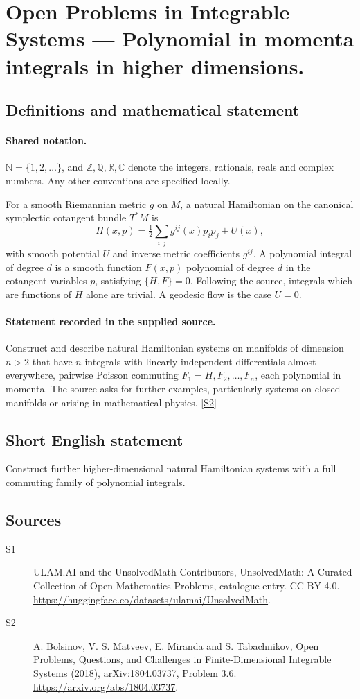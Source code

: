 \documentclass[11pt]{article}
\newcommand{\sref}[2]{\hyperlink{source:#1:#2}{[S#2]}}
\begin{document}
\section{Open Problems in Integrable Systems — Polynomial in momenta integrals in higher dimensions.}\label{statement}

\subsection{Definitions and mathematical statement}

\paragraph{Shared notation.}$\mathbb N=\{1,2,\ldots\}$, and $\mathbb Z,\mathbb Q,\mathbb R,\mathbb C$ denote the integers, rationals, reals and complex numbers. Any other conventions are specified locally.


For a smooth Riemannian metric $g$ on $M$, a natural Hamiltonian on the canonical symplectic cotangent bundle $T^*M$ is \[H(x,p)=\tfrac12\sum_{i,j}g^{ij}(x)p_ip_j+U(x),\] with smooth potential $U$ and inverse metric coefficients $g^{ij}$. A polynomial integral of degree $d$ is a smooth function $F(x,p)$ polynomial of degree $d$ in the cotangent variables $p$, satisfying $\{H,F\}=0$. Following the source, integrals which are functions of $H$ alone are trivial. A geodesic flow is the case $U=0$.
\paragraph{Statement recorded in the supplied source.}
Construct and describe natural Hamiltonian systems on manifolds of dimension $n>2$ that have $n$ integrals with linearly independent differentials almost everywhere, pairwise Poisson commuting $F_1=H,F_2,\ldots,F_n$, each polynomial in momenta. The source asks for further examples, particularly systems on closed manifolds or arising in mathematical physics. \sref{statement}{2}
\subsection{Short English statement}
Construct further higher-dimensional natural Hamiltonian systems with a full commuting family of polynomial integrals.
\subsection{Sources}
\begin{description}
\item[\hypertarget{source:statement:1}{S1}] ULAM.AI and the UnsolvedMath Contributors, UnsolvedMath: A Curated Collection of Open Mathematics Problems, catalogue entry. CC BY 4.0. \url{https://huggingface.co/datasets/ulamai/UnsolvedMath}.
\item[\hypertarget{source:statement:2}{S2}] A. Bolsinov, V. S. Matveev, E. Miranda and S. Tabachnikov, Open Problems, Questions, and Challenges in Finite-Dimensional Integrable Systems (2018), arXiv:1804.03737, Problem 3.6. \url{https://arxiv.org/abs/1804.03737}.
\end{description}
\label{end:statement}
\end{document}
